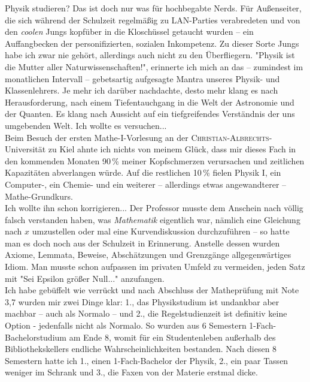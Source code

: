 \begin{multicols}{2}
Physik studieren? Das ist doch nur was für hochbegabte Nerds. Für Außenseiter, die sich während der Schulzeit regelmäßig zu LAN-Parties verabredeten und 
von den \textit{coolen} Jungs kopfüber in die Kloschüssel getaucht wurden -- ein Auffangbecken der personifizierten, sozialen Inkompetenz.
Zu dieser Sorte Jungs habe ich zwar nie gehört, allerdings auch nicht zu den Überfliegern.
"Physik ist die Mutter aller Naturwissenschaften!", erinnerte ich mich an das – zumindest im monatlichen Intervall – gebetsartig aufgesagte Mantra unseres
Physik- und Klassenlehrers. Je mehr ich darüber nachdachte, desto mehr klang es nach Herausforderung,
nach einem Tiefentauchgang in die Welt der Astronomie und der Quanten.
Es klang nach Aussicht auf ein tiefgreifendes Verständnis der uns umgebenden Welt. Ich wollte es versuchen... \\ 

Beim Besuch der ersten Mathe-\textsc{I}-Vorlesung an der \textsc{Christian-Albrechts}-Universität zu Kiel ahnte ich nichts von meinem Glück, dass mir dieses Fach in den kommenden Monaten 90\,\% meiner Kopfschmerzen
verursachen und zeitlichen Kapazitäten abverlangen würde.
Auf die restlichen 10\,\% fielen Physik \textsc{I}, ein Computer-, ein Chemie- und ein weiterer – allerdings etwas angewandterer – Mathe-Grundkurs. \\ 

Ich wollte ihn schon korrigieren... Der Professor musste dem Anschein nach völlig falsch verstanden haben, was \textit{Mathematik} eigentlich war,
nämlich eine Gleichung nach $x$ umzustellen oder mal eine Kurvendiskussion durchzuführen – so hatte man es doch noch aus der Schulzeit in Erinnerung.
Anstelle dessen wurden Axiome, Lemmata, Beweise, Abschätzungen und Grenzgänge allgegenwärtiges Idiom.
Man musste schon aufpassen im privaten Umfeld zu vermeiden, jeden Satz mit "Sei Epsilon größer Null..." anzufangen. \\ 

Ich habe gebüffelt wie verrückt und nach Abschluss der Matheprüfung mit Note 3,7 wurden mir zwei Dinge klar: 1., das Physikstudium ist undankbar aber
machbar – auch als Normalo – und 2., die Regelstudienzeit ist definitiv keine Option - jedenfalls nicht als Normalo.
So wurden aus 6 Semestern 1-Fach-Bachelorstudium am Ende 8, womit für ein Studentenleben außerhalb des
Bibliothekskellers endliche Wahrscheinlichkeiten bestanden. Nach diesen 8 Semestern hatte ich 1., einen 1-Fach-Bachelor der Physik, 2., ein paar Tassen weniger im
Schrank und 3., die Faxen von der Materie erstmal dicke. \\ 


\end{multicols}
